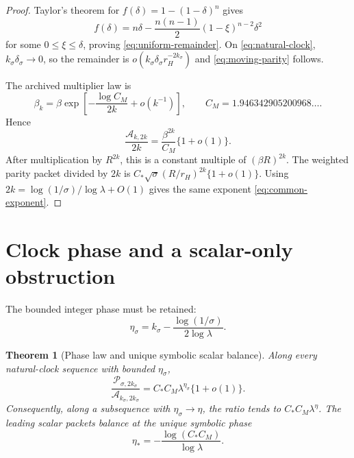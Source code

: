 \documentclass[11pt]{article}
\newtheorem{theorem}{Theorem}[section]
\theoremstyle{remark}
\newcommand{\1}{\mathbf 1}
\newcommand{\cA}{\mathcal A}
\newcommand{\cP}{\mathcal P}
\begin{document}
\begin{proof}
Taylor's theorem for $f(\delta)=1-(1-\delta)^n$ gives
\[
 f(\delta)=n\delta-\frac{n(n-1)}2(1-\xi)^{n-2}\delta^2
\]
for some $0\le\xi\le\delta$, proving \eqref{eq:uniform-remainder}.
On \eqref{eq:natural-clock}, $k_\sigma\delta_\sigma\to0$, so the remainder
is $o(k_\sigma\delta_\sigma r_H^{-2k_\sigma})$ and
\eqref{eq:moving-parity} follows.

The archived multiplier law is
\begin{equation}
 \beta_k=\beta\exp\left[-\frac{\log C_M}{2k}+o(k^{-1})\right],
 \qquad C_M=1.946342905200968\ldots .
 \label{eq:beta-k}
\end{equation}
Hence
\begin{equation}
 \frac{\cA_{k,2k}}{2k}
 =\frac{\beta^{2k}}{C_M}\{1+o(1)\}.
 \label{eq:alias-asymptotic}
\end{equation}
After multiplication by $R^{2k}$, this is a constant multiple of
$(\beta R)^{2k}$.  The weighted parity packet divided by $2k$ is
$C_*\sqrt\sigma(R/r_H)^{2k}\{1+o(1)\}$.  Using
$2k=\log(1/\sigma)/\log\lambda+O(1)$ gives the same exponent
\eqref{eq:common-exponent}.
\end{proof}

\section{Clock phase and a scalar-only obstruction}

The bounded integer phase must be retained:
\begin{equation}
 \eta_\sigma
 =k_\sigma-\frac{\log(1/\sigma)}{2\log\lambda}.
 \label{eq:phase}
\end{equation}

\begin{theorem}[Phase law and unique symbolic scalar balance]
\label{thm:phase-law}
Along every natural-clock sequence with bounded $\eta_\sigma$,
\begin{equation}
 \boxed{
 \frac{\cP_{\sigma,2k_\sigma}}{\cA_{k_\sigma,2k_\sigma}}
 =C_*C_M\lambda^{\eta_\sigma}\{1+o(1)\}.}
 \label{eq:ratio-law}
\end{equation}
Consequently, along a subsequence with $\eta_\sigma\to\eta$, the ratio tends
to $C_*C_M\lambda^\eta$.  The leading scalar packets balance at the unique
symbolic phase
\begin{equation}
 \eta_*=-\frac{\log(C_*C_M)}{\log\lambda}.
 \label{eq:balance-phase}
\end{equation}
\end{theorem}
\end{document}

